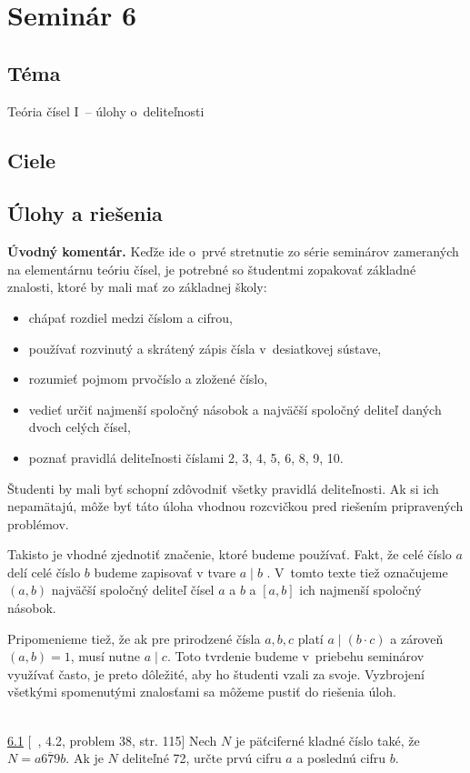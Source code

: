 \section*{Seminár 6}
\subsection*{Téma}
Teória čísel I~-- úlohy o~deliteľnosti
\subsection*{Ciele}


\subsection*{Úlohy a riešenia}
\textbf{Úvodný komentár.} Keďže ide o~prvé stretnutie zo série seminárov zameraných na elementárnu teóriu čísel, je potrebné so študentmi zopakovať základné znalosti, ktoré by mali mať zo základnej školy:
\begin{itemize}
\item chápať rozdiel medzi číslom a cifrou,
\item používať rozvinutý a skrátený zápis čísla v~desiatkovej sústave,
\item rozumieť pojmom prvočíslo a zložené číslo,
\item vedieť určiť najmenší spoločný násobok a najväčší spoločný deliteľ daných dvoch celých čísel,
\item poznať pravidlá deliteľnosti číslami 2, 3, 4, 5, 6, 8, 9, 10.
\end{itemize}
Študenti by mali byť schopní zdôvodniť všetky pravidlá deliteľnosti. Ak si ich nepamätajú, môže byť táto úloha vhodnou rozcvičkou pred riešením pripravených problémov.

Takisto je vhodné zjednotiť značenie, ktoré budeme používať.  Fakt, že celé číslo $a$ delí celé číslo $b$ budeme zapisovať v tvare $a \mid b$ . V~tomto texte tiež označujeme $(a,b)$ najväčší spoločný deliteľ čísel $a$ a $b$ a $[a,b]$ ich najmenší spoločný násobok.

Pripomenieme tiež, že ak pre prirodzené čísla $a, b, c$ platí $a \mid (b\cdot c)$ a zároveň $(a,b)=1$, musí nutne $a\mid c$. Toto tvrdenie budeme v~priebehu seminárov využívať často, je preto dôležité, aby ho študenti vzali za svoje. Vyzbrojení všetkými spomenutými znalosťami sa môžeme pustiť do riešenia úloh.\\
\\
\begin{tcolorbox}[breakable,notitle,boxrule=0pt,colback=light-gray,colframe=light-gray]\ul{6.1} [~\cite{holton2010}, 4.2, problem 38, str. 115] Nech $N$ je päťciferné kladné číslo také, že $N=\overline{a679b}$. Ak je $N$ deliteľné 72, určte prvú cifru $a$ a poslednú cifru $b$.

\end{tcolorbox}

